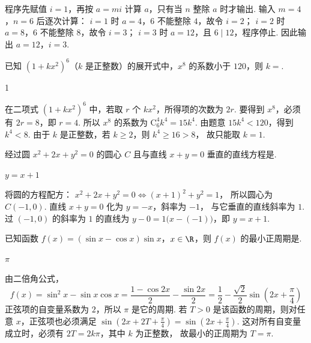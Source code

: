 \begin{solution}
程序先赋值 \(i=1\)，再按 \(a=mi\) 计算 \(a\)，只有当 \(n\) 整除 \(a\) 时才输出.
输入 \(m=4\)，\(n=6\) 后逐次计算：
\(i=1\) 时 \(a=4\)，\(6\) 不能整除 \(4\)，故令 \(i=2\)；
\(i=2\) 时 \(a=8\)，\(6\) 不能整除 \(8\)，故令 \(i=3\)；
\(i=3\) 时 \(a=12\)，且 \(6\mid12\)，程序停止.
因此输出 \(a=12\)，\(i=3\).
\end{solution}

\begin{problem}
已知 \((1 + kx^2)^6\)（\(k\) 是正整数）的展开式中，\(x^8\) 的系数小于 \(120\)，则 \(k =\)\fillinblank{}.
\end{problem}

\begin{answer}
1
\end{answer}

\begin{solution}
在二项式 \((1+kx^2)^6\) 中，若取 \(r\) 个 \(kx^2\)，所得项的次数为 \(2r\).
要得到 \(x^8\)，必须有 \(2r=8\)，即 \(r=4\).
所以 \(x^8\) 的系数为 \(\mathrm C_6^4 k^4=15k^4\).
由题意 \(15k^4<120\)，得到 \(k^4<8\).
由于 \(k\) 是正整数，若 \(k\geqslant2\)，则 \(k^4\geqslant16>8\)，
故只能取 \(k=1\).
\end{solution}

\begin{problem}
经过圆 \(x^2 + 2x + y^2 = 0\) 的圆心 \(C\) 且与直线 \(x + y = 0\) 垂直的直线方程是\fillinblank{}.
\end{problem}

\begin{answer}
\(y=x+1\)
\end{answer}

\begin{solution}
将圆的方程配方：
\(x^2+2x+y^2=0\Longleftrightarrow(x+1)^2+y^2=1\)，
所以圆心为 \(C(-1,0)\).
直线 \(x+y=0\) 化为 \(y=-x\)，斜率为 \(-1\)，
与它垂直的直线斜率为 \(1\).
过 \((-1,0)\) 的斜率为 \(1\) 的直线为
\(y-0=1\bigl(x-(-1)\bigr)\)，即 \(y=x+1\).
\end{solution}

\begin{problem}
已知函数 \(f(x) = (\sin x - \cos x)\sin x\)，\(x \in \R\)，则 \(f(x)\) 的最小正周期是\fillinblank{}.
\end{problem}

\begin{answer}
\(\pi\)
\end{answer}

\begin{solution}
由二倍角公式，
\[
f(x)=\sin^2x-\sin x\cos x
=\frac{1-\cos2x}{2}-\frac{\sin2x}{2}
=\frac12-\frac{\sqrt2}{2}\sin\left(2x+\frac{\pi}{4}\right)
\]
正弦项的自变量系数为 \(2\)，所以 \(\pi\) 是它的周期.
若 \(T>0\) 是该函数的周期，则对任意 \(x\)，正弦项也必须满足
\(\sin(2x+2T+\frac\pi4)=\sin(2x+\frac\pi4)\).
这对所有自变量成立时，必须有 \(2T=2k\pi\)，其中 \(k\) 为正整数，
故最小的正周期为 \(T=\pi\).
\end{solution}

